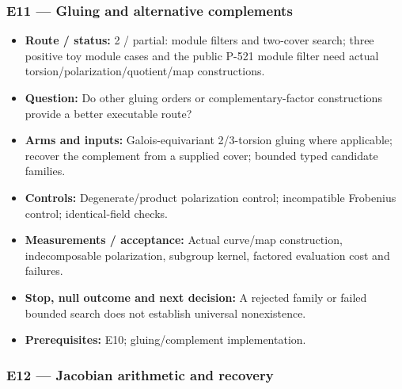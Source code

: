 \documentclass[
  10pt,
]{article}
\providecommand{\tightlist}{%
  \setlength{\itemsep}{0pt}\setlength{\parskip}{0pt}}
\begin{document}
\subsubsection{E11 --- Gluing and alternative
complements}\label{e11-gluing-and-alternative-complements}

\begin{itemize}
\tightlist
\item
  \textbf{Route / status:} 2 / partial: module filters and two-cover
  search; three positive toy module cases and the public P-521 module
  filter need actual torsion/polarization/quotient/map constructions.
\item
  \textbf{Question:} Do other gluing orders or complementary-factor
  constructions provide a better executable route?
\item
  \textbf{Arms and inputs:} Galois-equivariant 2/3-torsion gluing where
  applicable; recover the complement from a supplied cover; bounded
  typed candidate families.
\item
  \textbf{Controls:} Degenerate/product polarization control;
  incompatible Frobenius control; identical-field checks.
\item
  \textbf{Measurements / acceptance:} Actual curve/map construction,
  indecomposable polarization, subgroup kernel, factored evaluation cost
  and failures.
\item
  \textbf{Stop, null outcome and next decision:} A rejected family or
  failed bounded search does not establish universal nonexistence.
\item
  \textbf{Prerequisites:} E10; gluing/complement implementation.
\end{itemize}

\subsubsection{E12 --- Jacobian arithmetic and
recovery}\label{e12-jacobian-arithmetic-and-recovery}
\end{document}
